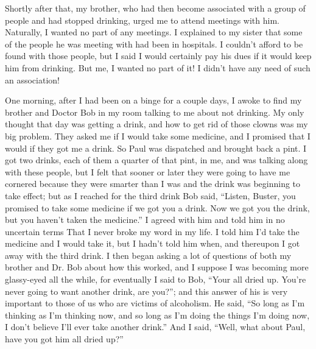 \begin{biblechapter}
\verse Shortly after that, my brother, 
    who had then become associated with a group of people 
    and had stopped drinking, 
    urged me to attend meetings with him.
\verse Naturally, I wanted no part of any meetings.
\verse I explained to my sister 
    that some of the people he was meeting with had been in hospitals.
\verse I couldn’t afford to be found with those people, 
    but I said I would certainly pay his dues 
    if it would keep him from drinking.
\verse But me, I wanted no part of it!
\verse I didn’t have any need of such an association!
\end{biblechapter}


\begin{biblechapter}
\verse One morning, 
    after I had been on a binge for a couple days, 
    I awoke to find my brother and Doctor Bob 
    in my room talking to me about not drinking.
\verse My only thought that day was getting a drink, 
    and how to get rid of those clowns was my big problem.
\verse They asked me if I would take some medicine, 
    and I promised that I would if they got me a drink.
\verse So Paul was dispatched and brought back a pint.
\verse I got two drinks, 
    each of them a quarter of that pint, in me, 
    and was talking along with these people, 
    but I felt that sooner or later 
    they were going to have me cornered 
    because they were smarter than I was 
    and the drink was beginning to take effect; 
    but as I reached for the third drink Bob said, 
\verse “Listen, Buster, 
    you promised to take some medicine if we got you a drink.
\verse Now we got you the drink, 
        but you haven’t taken the medicine.”
\verse I agreed with him and told him in no uncertain terms 
    That I never broke my word in my life.
\verse I told him I’d take the medicine and I would take it, 
    but I hadn’t told him when, 
    and thereupon I got away with the third drink.
\verse I then began asking a lot of questions 
    of both my brother and Dr. Bob about how this worked, 
    and I suppose I was becoming more glassy-eyed all the while, 
    for eventually I said to Bob, 
\verse “Your all dried up. 
\verse You’re never going to want another drink, are you?”; 
\verse and this answer of his is very important to those of us 
    who are victims of alcoholism.
\verse He said, 
    “So long as I’m thinking as I’m thinking now, 
    and so long as I’m doing the things I’m doing now, 
    I don’t believe I’ll ever take another drink.”
\verse And I said, 
    “Well, what about Paul, have you got him all dried up?”

\end{biblechapter}
